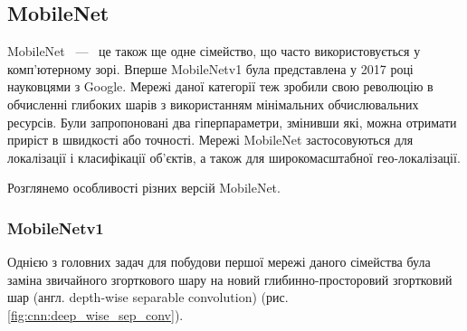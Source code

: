 \subsection{MobileNet}

MobileNet ~---~ це також ще одне сімейство, що часто використовується у комп'ютерному зорі.
Вперше MobileNetv1 \cite{mobilenetv1} була представлена у 2017 році науковцями з Google.
Мережі даної категорії теж зробили свою революцію в обчисленні глибоких шарів з
використанням мінімальних обчислювальних ресурсів. Були запропоновані два гіперпараметри,
змінивши які, можна отримати приріст в швидкості або точності. Мережі MobileNet
застосовуються для локалізації і класифікації об'єктів, а також для широкомасштабної
гео-локалізації.

Розглянемо особливості різних версій MobileNet.

\subsubsection{MobileNetv1}
Однією з головних задач для побудови першої мережі даного сімейства була заміна
звичайного згорткового шару на новий глибинно-просторовий згортковий шар
(англ. depth-wise separable convolution) (рис. \ref{fig:cnn:deep_wise_sep_conv}).

